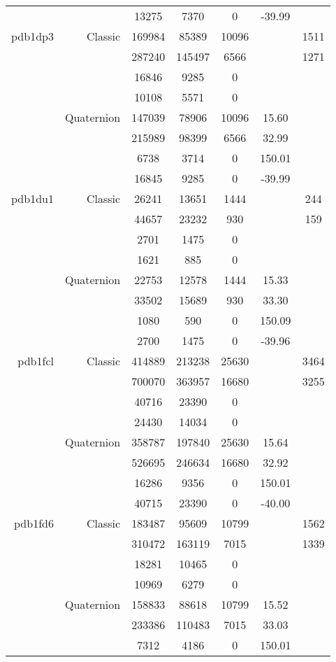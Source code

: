 \begin{xltabular}{\textwidth}{r|rcccSc}
& & 13275 & 7370 & 0 & -39.99 & \\ \addlinespace
pdb1dp3 & Classic & 169984 & 85389 & 10096 & & 1511 \\
& & 287240 & 145497 & 6566 & & 1271 \\
& & 16846 & 9285 & 0 & & \\
& & 10108 & 5571 & 0 & & \\
& Quaternion & 147039 & 78906 & 10096 & 15.60 & \\
& & 215989 & 98399 & 6566 & 32.99 & \\
& & 6738 & 3714 & 0 & 150.01 & \\
& & 16845 & 9285 & 0 & -39.99 & \\ \addlinespace
pdb1du1 & Classic & 26241 & 13651 & 1444 & & 244 \\
& & 44657 & 23232 & 930 & & 159 \\
& & 2701 & 1475 & 0 & & \\
& & 1621 & 885 & 0 & & \\
& Quaternion & 22753 & 12578 & 1444 & 15.33 & \\
& & 33502 & 15689 & 930 & 33.30 & \\
& & 1080 & 590 & 0 & 150.09 & \\
& & 2700 & 1475 & 0 & -39.96 & \\ \addlinespace
pdb1fcl & Classic & 414889 & 213238 & 25630 & & 3464 \\
& & 700070 & 363957 & 16680 & & 3255 \\
& & 40716 & 23390 & 0 & & \\
& & 24430 & 14034 & 0 & & \\
& Quaternion & 358787 & 197840 & 25630 & 15.64 & \\
& & 526695 & 246634 & 16680 & 32.92 & \\
& & 16286 & 9356 & 0 & 150.01 & \\
& & 40715 & 23390 & 0 & -40.00 & \\ \addlinespace
pdb1fd6 & Classic & 183487 & 95609 & 10799 & & 1562 \\
& & 310472 & 163119 & 7015 & & 1339 \\
& & 18281 & 10465 & 0 & & \\
& & 10969 & 6279 & 0 & & \\
& Quaternion & 158833 & 88618 & 10799 & 15.52 & \\
& & 233386 & 110483 & 7015 & 33.03 & \\
& & 7312 & 4186 & 0 & 150.01 & \\

\end{xltabular}
